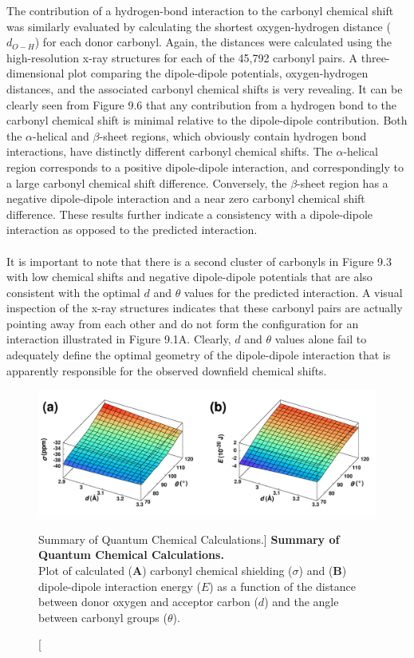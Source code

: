 \begin{doublespace}
The contribution of a hydrogen-bond interaction to the carbonyl \cnmr{}
chemical shift was similarly evaluated by calculating the shortest
oxygen-hydrogen distance ($d_{O-H}$) for each donor carbonyl. Again, the
distances were calculated using the high-resolution x-ray structures for each
of the 45,792 carbonyl pairs. A three-dimensional plot comparing the
dipole-dipole potentials, oxygen-hydrogen distances, and the associated
carbonyl \cnmr{} chemical shifts is very revealing. It can be clearly seen
from Figure 9.6 that any contribution from a hydrogen bond to the \cnmr{}
carbonyl chemical shift is minimal relative to the dipole-dipole contribution.
Both the $\alpha$-helical and $\beta$-sheet regions, which obviously contain
hydrogen bond interactions, have distinctly different \cnmr{} carbonyl chemical
shifts. The $\alpha$-helical region corresponds to a positive dipole-dipole
interaction, and correspondingly to a large carbonyl \cnmr{} chemical shift
difference. Conversely, the $\beta$-sheet region has a negative dipole-dipole
interaction and a near zero carbonyl \cnmr{} chemical shift difference. These
results further indicate a consistency with a dipole-dipole interaction as
opposed to the predicted \npistar{} interaction.
\\\\
It is important to note that there is a second cluster of carbonyls in Figure
9.3 with low \cnmr{} chemical shifts and negative dipole-dipole potentials that
are also consistent with the optimal $d$ and $\theta$ values for the predicted
\npistar{} interaction. A visual inspection of the x-ray structures indicates
that these carbonyl pairs are actually pointing away from each other and do not
form the configuration for an \npistar{} interaction illustrated in Figure
9.1A. Clearly, $d$ and $\theta$ values alone fail to adequately define the
optimal geometry of the dipole-dipole interaction that is apparently
responsible for the observed downfield \cnmr{} chemical shifts.
\end{doublespace}

\begin{figure}[h!]
\includegraphics[width=6.5in]{figs/npistar/07-surf-a.png}
\caption
      [Summary of Quantum Chemical Calculations.]{
  {\bf Summary of Quantum Chemical Calculations.}
  \\
  Plot of calculated ({\bf A}) carbonyl \cnmr{} chemical shielding ($\sigma$)
  and ({\bf B}) dipole-dipole interaction energy ($E$) as a function of the
  distance between donor oxygen and acceptor carbon ($d$) and the angle
  between carbonyl groups ($\theta$).
}
\end{figure}

